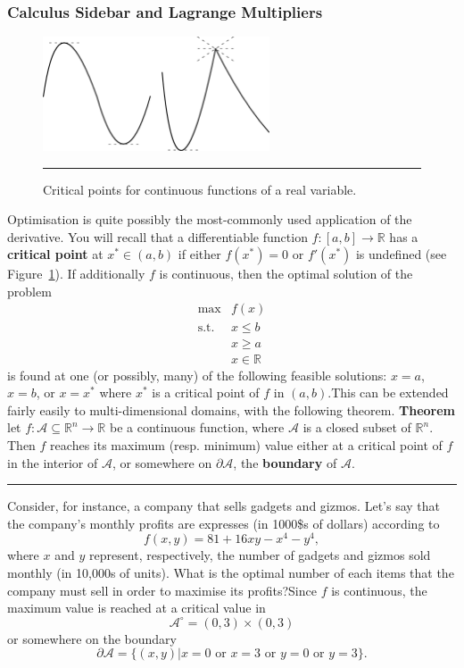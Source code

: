 \subsubsection{Calculus Sidebar and Lagrange Multipliers}
\begin{figure}[!t]
\centering
\includegraphics[width=0.6\textwidth]{images/OPT/extrema.png}
\caption[\small Critical points for continuous functions of a real variable]{\small Critical points for continuous functions of a real variable.}\hrule\label{fig:extrema}
\end{figure}
Optimisation is quite possibly the most-commonly used application of the derivative. You will recall that a differentiable function $f:[a,b]\to \mathbb{R}$ has a \textbf{critical point} at $x^*\in (a,b)$ if either $f(x^*)=0$ or $f'(x^*)$ is undefined (see Figure~\ref{fig:extrema}). If additionally $f$ is continuous, then the optimal solution of the problem
\[\begin{array}{rl}
\max & f(x) \\
\mbox{s.t.} & x\leq b \\ 
 & x\geq a \\ 
&x \in \mathbb{R}
\end{array}\]
is found at one (or possibly, many) of the following feasible solutions: $x=a$, $x=b$, or $x=x^*$ where $x^*$ is a critical point of $f$ in $(a,b)$.\newl This can be extended fairly easily to multi-dimensional domains, with the following theorem. 
\newl \textbf{Theorem} let $f:\mathcal{A}\subseteq \mathbb{R}^n\to \mathbb{R}$ be a continuous function, where $\mathcal{A}$ is a closed subset of $\mathbb{R}^n$. Then $f$ reaches its maximum (resp. minimum) value either at a critical point of $f$ in the interior of $\mathcal{A}$, or somewhere on $\partial\!\!\mathcal{A}$, the \textbf{boundary} of $\mathcal{A}$. 
\begin{center}\rule{0.5\linewidth}{.4pt}\end{center}
Consider, for instance, a company that sells gadgets and gizmos. Let's say that the company's monthly profits are expresses (in 1000\$s of dollars) according to $$f(x,y)=81+16xy-x^4-y^4, $$ where $x$ and $y$ represent, respectively, the number of gadgets and gizmos sold monthly (in 10,000s of units). What is the optimal number of each items that the company must sell in order to maximise its profits?\newl Since $f$ is continuous, the maximum value is reached at a critical value in $$\mathcal{A}^{\circ}=(0,3)\times (0,3)$$ or somewhere on the boundary $$\partial\!\!\mathcal{A}=\{(x,y)|x=0 \mbox{ or }x=3\mbox{ or }y=0\mbox{ or }y=3\}.$$
